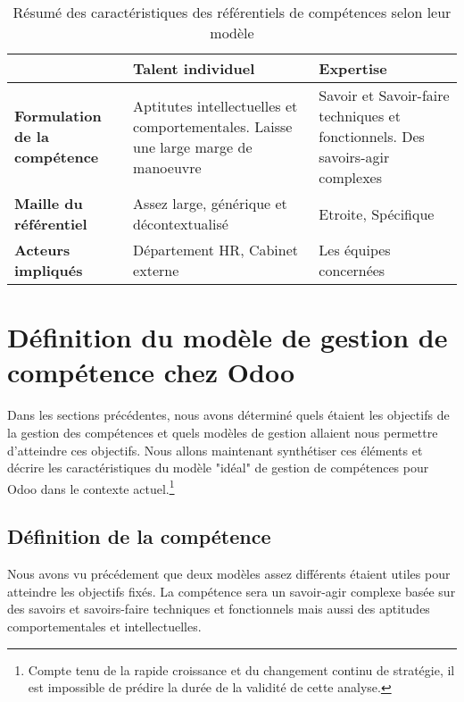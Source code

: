 \begin{table}[H]
  \caption{Résumé des caractéristiques des référentiels de compétences selon leur modèle}
  \label{model_comp}

  \begin{center}
    \begin{tabular}{p{}p{}p{}}
      & \textbf{Talent individuel} & \textbf{Expertise} \\
      \hline
      \textbf{Formulation de la compétence} & Aptitutes intellectuelles et comportementales. Laisse une large marge de manoeuvre & Savoir et Savoir-faire techniques et fonctionnels. Des savoirs-agir complexes\\
      \textbf{Maille du référentiel} & Assez large, générique et décontextualisé & Etroite, Spécifique\\
      \textbf{Acteurs impliqués}  & Département HR, Cabinet externe &  Les équipes concernées\\
  
    \end{tabular}
  \end{center}
\end{table}

\section{Définition du modèle de gestion de compétence chez Odoo}
Dans les sections précédentes, nous avons déterminé quels étaient les objectifs de la gestion des compétences et quels modèles de gestion allaient nous permettre d'atteindre ces objectifs. Nous allons maintenant synthétiser ces éléments et décrire les caractéristiques du modèle "idéal" de gestion de compétences pour Odoo dans le contexte actuel.\footnote{Compte tenu de la rapide croissance et du changement continu de stratégie, il est impossible de prédire la durée de la validité de cette analyse.} 

\subsection{Définition de la compétence}
Nous avons vu précédement que deux modèles assez différents étaient utiles pour atteindre les objectifs fixés. La compétence sera un savoir-agir complexe basée sur des savoirs et savoirs-faire techniques et fonctionnels mais aussi des aptitudes comportementales et intellectuelles. 

